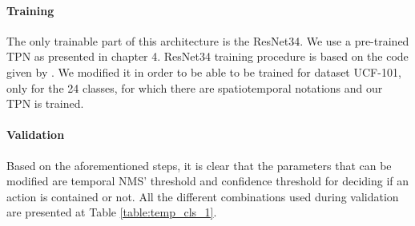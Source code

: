 \paragraph{Training} The only trainable part of this architecture is the ResNet34. We use a pre-trained TPN as presented in chapter 4.
ResNet34 training procedure is based on the code given by \cite{hara3dcnns}. We modified it in order to be able to be trained for dataset
UCF-101, only for the 24 classes, for which there are spatiotemporal notations and our TPN is trained. 

\paragraph{Validation}
Based on the aforementioned steps, it is clear that the parameters that can be modified are temporal NMS' threshold and confidence
threshold for deciding if an action is contained or not. All the different combinations used during validation are presented at Table
\ref{table:temp_cls_1}.
  
